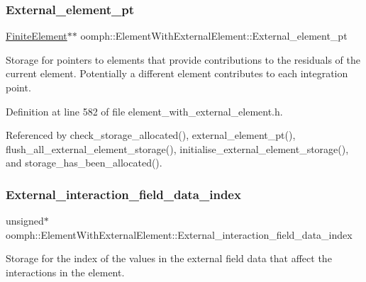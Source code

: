 \subsubsection{\texorpdfstring{External\+\_\+element\+\_\+pt}{External\_element\_pt}}
{\footnotesize\ttfamily \hyperlink{classoomph_1_1FiniteElement}{Finite\+Element}$\ast$$\ast$ oomph\+::\+Element\+With\+External\+Element\+::\+External\+\_\+element\+\_\+pt\hspace{0.3cm}{\ttfamily [private]}}



Storage for pointers to elements that provide contributions to the residuals of the current element. Potentially a different element contributes to each integration point. 



Definition at line 582 of file element\+\_\+with\+\_\+external\+\_\+element.\+h.



Referenced by check\+\_\+storage\+\_\+allocated(), external\+\_\+element\+\_\+pt(), flush\+\_\+all\+\_\+external\+\_\+element\+\_\+storage(), initialise\+\_\+external\+\_\+element\+\_\+storage(), and storage\+\_\+has\+\_\+been\+\_\+allocated().

\mbox{\label{classoomph_1_1ElementWithExternalElement_a4974acb07f164a01a41912e7aae63f02}} 
\subsubsection{\texorpdfstring{External\+\_\+interaction\+\_\+field\+\_\+data\+\_\+index}{External\_interaction\_field\_data\_index}}
{\footnotesize\ttfamily unsigned$\ast$ oomph\+::\+Element\+With\+External\+Element\+::\+External\+\_\+interaction\+\_\+field\+\_\+data\+\_\+index\hspace{0.3cm}{\ttfamily [private]}}



Storage for the index of the values in the external field data that affect the interactions in the element. 



